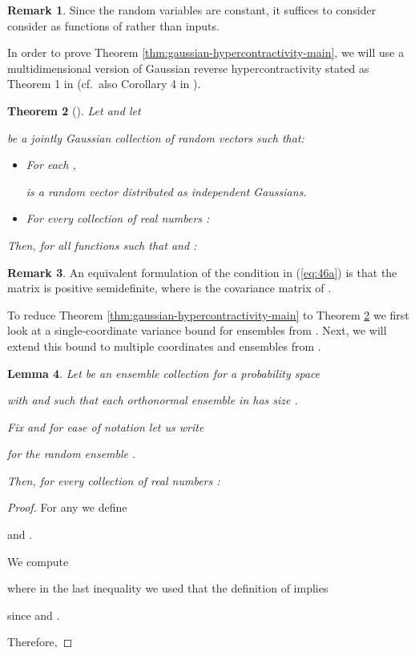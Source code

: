 \documentclass{daj}
\newcommand{\1}{\mathbbm{1}}
\theoremstyle{plain}
\newtheorem{theorem}{Theorem}[section]
\newtheorem{lemma}[theorem]{Lemma}
\theoremstyle{definition}
\newtheorem{remark}[theorem]{Remark}
\begin{document}
\begin{remark}
Since the random variables  are constant,
it suffices to consider consider  as functions of  rather 
than  inputs. 
\end{remark}

In order to prove Theorem \ref{thm:gaussian-hypercontractivity-main},
we will use a multidimensional version of Gaussian reverse hypercontractivity
stated as Theorem 1 in \cite{CDP13} (cf.~also Corollary 4 in \cite{Led14}).

\begin{theorem}[\cite{CDP13}]\label{thm:gaussian-cdp} Let  and let

be a jointly Gaussian collection of  random vectors such that:
\begin{itemize}
  \item
    For each , 
    
    is a random vector distributed as  independent 
    Gaussians.
  \item
    For every collection of real numbers :
    
\end{itemize}
Then, for all functions 
such that 
and :

\end{theorem}

\begin{remark}
An equivalent formulation of the condition in (\ref{eq:46a}) 
is that the matrix  is positive semidefinite,
where  is the covariance matrix of .  
\end{remark}

To reduce Theorem \ref{thm:gaussian-hypercontractivity-main}
to Theorem \ref{thm:gaussian-cdp} we 
first look at a single-coordinate variance bound for 
ensembles from . 
Next, we will extend this bound to multiple coordinates
and ensembles from  .

\begin{lemma}
\label{lem:gaussian-single-coordinate}
Let 
be an ensemble collection
for a probability space 

with 
and such that each orthonormal ensemble in 
has size .

Fix  and for ease of notation
let us write 

for the random ensemble 
.

Then,
for every collection of real numbers :

\end{lemma}

\begin{proof}
For any  we define

and .

We compute

where in the last inequality we used that the definition of  implies

since  and 
.

Therefore, 

\end{proof}
\end{document}
